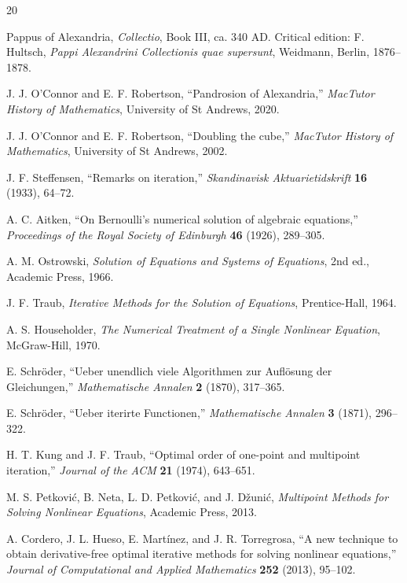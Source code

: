 \documentclass[10pt,a4paper]{article}
\theoremstyle{plain}
\theoremstyle{definition}
\theoremstyle{remark}
\begin{document}
\begin{thebibliography}{20}

Pappus of Alexandria,
\textit{Collectio}, Book III, ca. 340 AD.
Critical edition: F. Hultsch, \textit{Pappi Alexandrini Collectionis quae supersunt},
Weidmann, Berlin, 1876--1878.

J. J. O'Connor and E. F. Robertson,
``Pandrosion of Alexandria,''
\textit{MacTutor History of Mathematics}, University of St Andrews, 2020.

J. J. O'Connor and E. F. Robertson,
``Doubling the cube,''
\textit{MacTutor History of Mathematics}, University of St Andrews, 2002.

J. F. Steffensen,
``Remarks on iteration,''
\textit{Skandinavisk Aktuarietidskrift} \textbf{16} (1933), 64--72.

A. C. Aitken,
``On Bernoulli's numerical solution of algebraic equations,''
\textit{Proceedings of the Royal Society of Edinburgh} \textbf{46} (1926), 289--305.

A. M. Ostrowski,
\textit{Solution of Equations and Systems of Equations},
2nd ed., Academic Press, 1966.

J. F. Traub,
\textit{Iterative Methods for the Solution of Equations},
Prentice-Hall, 1964.

A. S. Householder,
\textit{The Numerical Treatment of a Single Nonlinear Equation},
McGraw-Hill, 1970.

E. Schr\"oder,
``Ueber unendlich viele Algorithmen zur Aufl\"osung der Gleichungen,''
\textit{Mathematische Annalen} \textbf{2} (1870), 317--365.

E. Schr\"oder,
``Ueber iterirte Functionen,''
\textit{Mathematische Annalen} \textbf{3} (1871), 296--322.

H. T. Kung and J. F. Traub,
``Optimal order of one-point and multipoint iteration,''
\textit{Journal of the ACM} \textbf{21} (1974), 643--651.

M. S. Petkovi\'c, B. Neta, L. D. Petkovi\'c, and J. D\v{z}uni\'c,
\textit{Multipoint Methods for Solving Nonlinear Equations},
Academic Press, 2013.

A. Cordero, J. L. Hueso, E. Mart\'inez, and J. R. Torregrosa,
``A new technique to obtain derivative-free optimal iterative methods for solving nonlinear equations,''
\textit{Journal of Computational and Applied Mathematics} \textbf{252} (2013), 95--102.


\end{thebibliography}
\end{document}
